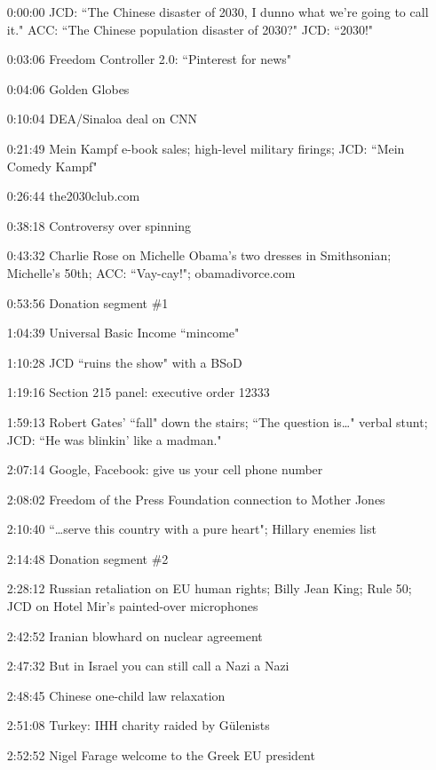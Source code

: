 \documentclass{report}
\newcommand{\mono}[1]{{\fontspec{Courier}#1}}
\begin{document}
\begin{itemize}
\item[\mono{0:00:00}] JCD: ``The Chinese disaster of 2030, I dunno what we're going to call it." ACC: ``The Chinese population disaster of 2030?" JCD: ``2030!"
\item[\mono{0:03:06}] Freedom Controller 2.0: ``Pinterest for news"
\item[\mono{0:04:06}] Golden Globes
\item[\mono{0:10:04}] DEA/Sinaloa deal on CNN
\item[\mono{0:21:49}] Mein Kampf e-book sales; high-level military firings; JCD: ``Mein Comedy Kampf"
\item[\mono{0:26:44}] the2030club.com
\item[\mono{0:38:18}] Controversy over spinning
\item[\mono{0:43:32}] Charlie Rose on Michelle Obama's two dresses in Smithsonian; Michelle's 50th; ACC: ``Vay-cay!"; obamadivorce.com
\item[\mono{0:53:56}] Donation segment \#1
\item[\mono{1:04:39}] Universal Basic Income ``mincome"
\item[\mono{1:10:28}] JCD ``ruins the show" with a BSoD
\item[\mono{1:19:16}] Section 215 panel: executive order 12333
\item[\mono{1:59:13}] Robert Gates' ``fall" down the stairs; ``The question is…" verbal stunt; JCD: ``He was blinkin' like a madman."
\item[\mono{2:07:14}] Google, Facebook: give us your cell phone number
\item[\mono{2:08:02}] Freedom of the Press Foundation connection to Mother Jones
\item[\mono{2:10:40}] ``…serve this country with a pure heart"; Hillary enemies list
\item[\mono{2:14:48}] Donation segment \#2
\item[\mono{2:28:12}] Russian retaliation on EU human rights; Billy Jean King; Rule 50; JCD on Hotel Mir's painted-over microphones
\item[\mono{2:42:52}] Iranian blowhard on nuclear agreement
\item[\mono{2:47:32}] But in Israel you can still call a Nazi a Nazi
\item[\mono{2:48:45}] Chinese one-child law relaxation
\item[\mono{2:51:08}] Turkey: IHH charity raided by Gülenists
\item[\mono{2:52:52}] Nigel Farage welcome to the Greek EU president
\end{itemize}
\end{document}
